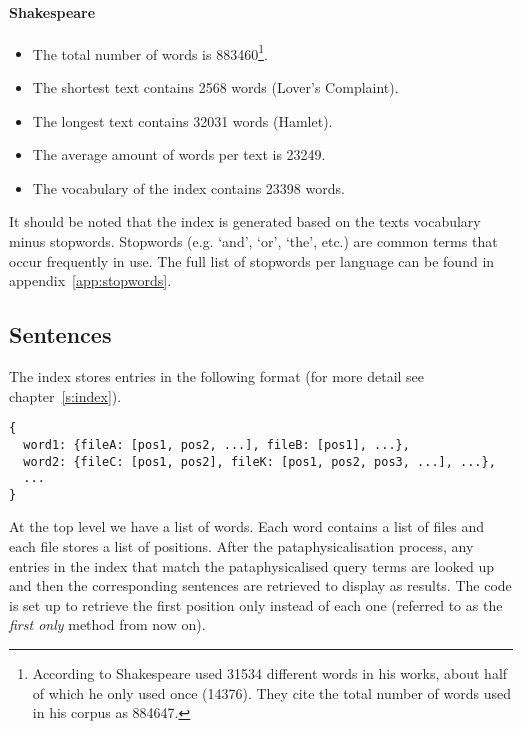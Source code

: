 \paragraph*{Shakespeare}
\begin{itemize}
  \item The total number of words is \num{883460}\footnote{According to \autocite{Efron1976} Shakespeare used \num{31534} different words in his works, about half of which he only used once (\num{14376}). They cite the total number of words used in his corpus as \num{884647}.}.
  \item The shortest text contains \num{2568} words (Lover's Complaint).
  \item The longest text contains \num{32031} words (Hamlet).
  \item The average amount of words per text is \num{23249}.
  \item The vocabulary of the index contains \num{23398} words.
\end{itemize}

It should be noted that the index is generated based on the texts vocabulary minus stopwords. Stopwords (e.g. `and', `or', `the', etc.) are common terms that occur frequently in use. The full list of stopwords per language can be found in appendix~\ref{app:stopwords}.


\subsection{Sentences}
\label{s:sents}

The index stores entries in the following format (for more detail see chapter~\ref{s:index}).

\begin{verbatim}
{
  word1: {fileA: [pos1, pos2, ...], fileB: [pos1], ...},
  word2: {fileC: [pos1, pos2], fileK: [pos1, pos2, pos3, ...], ...},
  ...
}
\end{verbatim}

At the top level we have a list of words. Each word contains a list of files and each file stores a list of positions. After the pataphysicalisation process, any entries in the index that match the pataphysicalised query terms are looked up and then the corresponding sentences are retrieved to display as results. The code is set up to retrieve the first position only instead of each one (referred to as the \emph{first only} method from now on).


